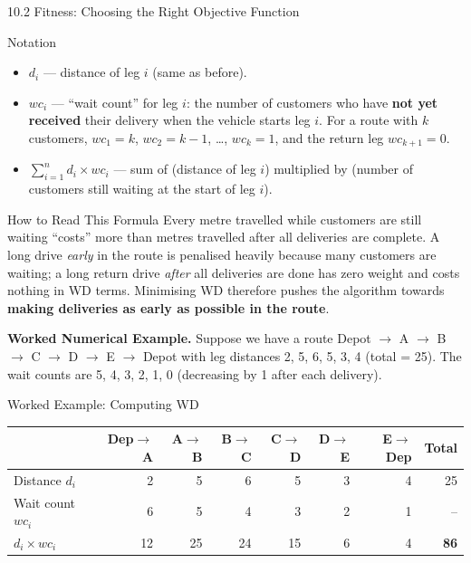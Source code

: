 \documentclass[aspectratio=169,10pt]{beamer}
\begin{document}
\begin{frame}[allowframebreaks]{10.2 Fitness: Choosing the Right Objective Function}
  \begin{block}{Notation}
    \begin{itemize}
      \item $d_i$ — distance of leg $i$ (same as before).
      \item $wc_i$ — ``wait count'' for leg $i$: the number of
            customers who have \textbf{not yet received} their delivery
            when the vehicle starts leg $i$.  For a route with $k$
            customers, $wc_1 = k$, $wc_2 = k-1$, \ldots, $wc_k = 1$,
            and the return leg $wc_{k+1} = 0$.
      \item $\sum_{i=1}^{n} d_i \times wc_i$ — sum of (distance of
            leg $i$) multiplied by (number of customers still waiting
            at the start of leg $i$).
    \end{itemize}
  \end{block}

  \begin{alertblock}{How to Read This Formula}
    Every metre travelled while customers are still waiting
    ``costs'' more than metres travelled after all deliveries are
    complete.  A long drive \emph{early} in the route is penalised
    heavily because many customers are waiting; a long return drive
    \emph{after} all deliveries are done has zero weight and costs
    nothing in WD terms.  Minimising WD therefore pushes the
    algorithm towards \textbf{making deliveries as early as possible
    in the route}.
  \end{alertblock}

  \framebreak

  \textbf{Worked Numerical Example.}
  Suppose we have a route Depot $\to$ A $\to$ B $\to$ C $\to$ D $\to$
  E $\to$ Depot with leg distances 2, 5, 6, 5, 3, 4 (total = 25).
  The wait counts are 5, 4, 3, 2, 1, 0 (decreasing by 1 after each
  delivery).

  \begin{exampleblock}{Worked Example: Computing WD}
    \begin{tabular}{lrrrrrrr}
      \toprule
      & Dep$\to$A & A$\to$B & B$\to$C & C$\to$D & D$\to$E
        & E$\to$Dep & Total \\
      \midrule
      Distance $d_i$ & 2 & 5 & 6 & 5 & 3 & 4 & 25 \\
      Wait count $wc_i$ & 6 & 5 & 4 & 3 & 2 & 1 & -- \\
      $d_i \times wc_i$ & 12 & 25 & 24 & 15 & 6 & 4 & \textbf{86} \\
      \bottomrule
    \end{tabular}


\end{exampleblock}
\end{frame}
\end{document}

